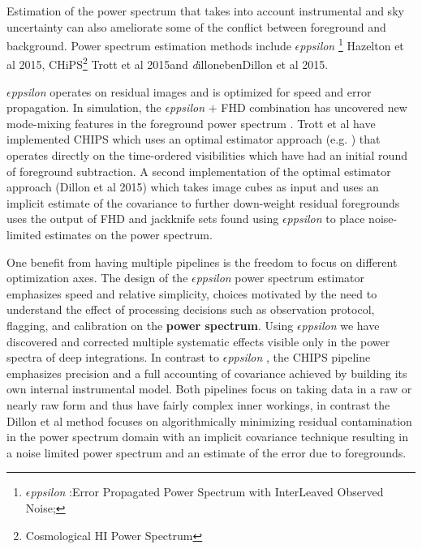 \documentclass[preprint]{aastex}
\def\eppsilon{{\it $\epsilon$ppsilon }}
\def\implicitcov{{\emph dilloneben}}
\def\chipscite{Trott et al 2015}
\def\eppsiloncite{Hazelton et al 2015}
\def\dilloncite{Dillon et al 2015}
\begin{document}
 Estimation of the power spectrum that takes into account instrumental and sky uncertainty can also ameliorate some of the conflict between foreground and background.  Power spectrum estimation methods include \eppsilon\footnote{\eppsilon:Error Propagated Power Spectrum with InterLeaved Observed Noise;} \eppsiloncite, CHiPS\footnote{Cosmological HI Power Spectrum} \chipscite and \implicitcov \dilloncite.
 
 \eppsilon  operates on residual images and is optimized for speed and error propagation. In simulation, the \eppsilon $+$ FHD combination has uncovered new mode-mixing features in the foreground power spectrum \citep{Morales:2012p8790}.  Trott et al have implemented CHIPS which uses an optimal estimator approach (e.g. \cite{Liu:2011p8763})  that operates directly on the time-ordered visibilities which have had an initial round of foreground subtraction.  A second implementation of the optimal estimator approach (Dillon et al 2015) which takes image cubes as input and uses an implicit estimate of the covariance to further down-weight residual foregrounds uses the output of FHD and jackknife sets found using \eppsilon to place noise-limited estimates on the power spectrum.

One benefit from having multiple pipelines is the freedom to focus on different optimization axes.  The design of the \eppsilon power spectrum estimator emphasizes speed and relative simplicity, choices  motivated by the need to understand the effect of processing decisions such as observation protocol, flagging, and calibration on the {\bf power spectrum}. Using \eppsilon we have discovered and corrected multiple systematic effects visible only in the power spectra of deep integrations.  In contrast to \eppsilon, the CHIPS pipeline emphasizes precision and a full accounting of covariance achieved by building its own internal instrumental model.  Both pipelines focus on taking data in a raw or nearly raw form and thus have fairly complex inner workings, in contrast the Dillon et al method focuses on algorithmically minimizing residual contamination in the power spectrum domain with an implicit covariance technique resulting in a noise limited power spectrum and an estimate of the error due to foregrounds.


\end{document}
